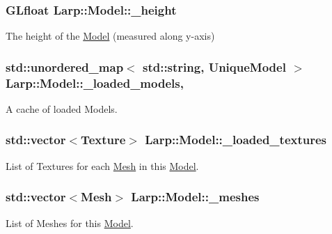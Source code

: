 \subsubsection[{\texorpdfstring{\+\_\+height}{_height}}]{\setlength{\rightskip}{0pt plus 5cm}G\+Lfloat Larp\+::\+Model\+::\+\_\+height\hspace{0.3cm}{\ttfamily [private]}}\hypertarget{classLarp_1_1Model_ad1df92245551dec38b11c6c3ec7caf57}{}\label{classLarp_1_1Model_ad1df92245551dec38b11c6c3ec7caf57}
The height of the \hyperlink{classLarp_1_1Model}{Model} (measured along y-\/axis) 
\subsubsection[{\texorpdfstring{\+\_\+loaded\+\_\+models}{_loaded_models}}]{\setlength{\rightskip}{0pt plus 5cm}std\+::unordered\+\_\+map$<$ std\+::string, {\bf Unique\+Model} $>$ Larp\+::\+Model\+::\+\_\+loaded\+\_\+models\hspace{0.3cm}{\ttfamily [static]}, {\ttfamily [private]}}\hypertarget{classLarp_1_1Model_a16622503878890cd0469620863cf142a}{}\label{classLarp_1_1Model_a16622503878890cd0469620863cf142a}
A cache of loaded Models. 
\subsubsection[{\texorpdfstring{\+\_\+loaded\+\_\+textures}{_loaded_textures}}]{\setlength{\rightskip}{0pt plus 5cm}std\+::vector$<${\bf Texture}$>$ Larp\+::\+Model\+::\+\_\+loaded\+\_\+textures\hspace{0.3cm}{\ttfamily [private]}}\hypertarget{classLarp_1_1Model_ac5e40faa76039650ae6b32828b8681f9}{}\label{classLarp_1_1Model_ac5e40faa76039650ae6b32828b8681f9}
List of Textures for each \hyperlink{classLarp_1_1Mesh}{Mesh} in this \hyperlink{classLarp_1_1Model}{Model}. 
\subsubsection[{\texorpdfstring{\+\_\+meshes}{_meshes}}]{\setlength{\rightskip}{0pt plus 5cm}std\+::vector$<${\bf Mesh}$>$ Larp\+::\+Model\+::\+\_\+meshes\hspace{0.3cm}{\ttfamily [private]}}\hypertarget{classLarp_1_1Model_ae75758feb59857f6b907bbfa0cf993f2}{}\label{classLarp_1_1Model_ae75758feb59857f6b907bbfa0cf993f2}
List of Meshes for this \hyperlink{classLarp_1_1Model}{Model}. 
